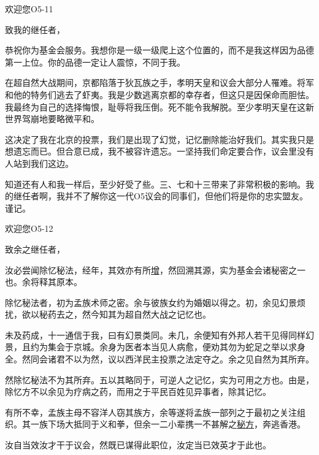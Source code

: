 \begin{scpbox}

欢迎您O5-11

致我的继任者，

恭祝你为基金会服务。我想你是一级一级爬上这个位置的，而不是我这样因为品德第一上位。你的品德一定让人震惊，不同于我。

在超自然大战期间，京都陷落于狄瓦族之手，孝明天皇和议会大部分人罹难。将军和他的特务们逃去了虾夷。我是少数逃离京都的幸存者，但这只是因保命而胆怯。我最终为自己的选择悔恨，耻辱将我压倒。死不能令我解脱。至少孝明天皇在这新世界驾崩地要略微平和。

这决定了我在北京的投票，我们是出现了幻觉，记忆删除能治好我们。其实我只是想遗忘而已。但合意已成，我不被容许遗忘。一坚持我们命定要合作，议会里没有人站到我们这边。

知道还有人和我一样后，至少好受了些。三、七和十三带来了非常积极的影响。我的继任者啊，我并不了解你这一代O5议会的同事们，但他们将是你的忠实盟友。谨记。

\end{scpbox}

\begin{scpbox}

欢迎您O5-12

致余之继任者，

汝必尝闻除忆秘法，经年，其效亦有所\hyperref[chap:SCP-3000]{增}，然回溯其源，实为基金会诸秘密之一也。余将释其原本。

除忆秘法者，初为孟族术师之密。余与彼族女约为婚姻以得之。初，余见幻景烦扰，欲以秘药去之，然今知其为超自然大战之记忆也。

未及药成，十一通信于我，曰有幻景类同。未几，余便知有外邦人若干见得同样幻景，且约为集会于京城。余身为医者本当见人病愈，便劝其勿为蛇足之举以求身全。然同会诸君不以为然，议以西洋民主投票之法定夺之。余之见自然为其所弃。

然除忆秘法不为其所弃。五以其略同于，可逆人之记忆，实为可用之方也。由是，除忆方不以余见为疗病之药，而用之于平民百姓见异事者，除其记忆。

有所不幸，孟族主母不容洋人窃其族方，余等遂将孟族一部列之于最初之关注组织。其一族下场大抵同于义和拳，但余一二小辈携一不甚解之\hyperref[chap:SCP-484]{秘方}，奔逃香港。

汝自当效汝才干于议会，然既已谋得此职位，汝定当已效英才于此也。

\end{scpbox}

